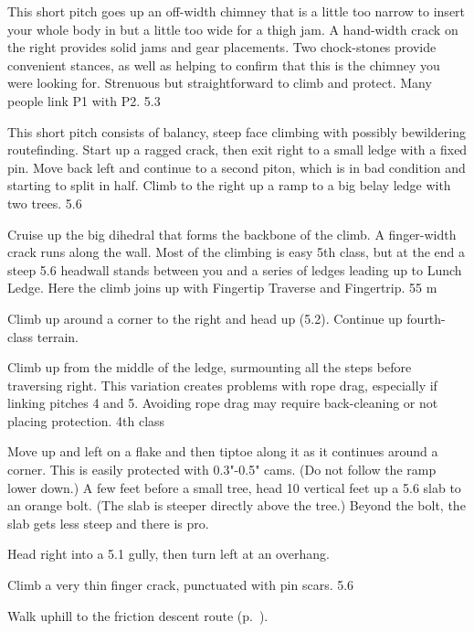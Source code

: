 \documentclass{tahquitz}
\begin{document}
 This short pitch goes up an off-width chimney that is a little too
narrow to insert your whole body in but a little too wide for a thigh jam.
A hand-width crack on the right provides solid jams and gear placements.
Two chock-stones provide convenient stances, as well as helping
to confirm that this is the chimney you were looking for. 
Strenuous but straightforward to climb and protect.
Many people link P1 with P2. 5.3

 This short pitch consists of balancy, steep face climbing with
possibly bewildering routefinding. Start up a ragged crack, then
exit right to a small ledge with a fixed pin.
Move back left and continue to a second piton, which is in bad condition
and starting to split in half. Climb to the right up a ramp to a big belay
ledge with two trees. 5.6

 Cruise up the big dihedral that forms the backbone of the climb. A
finger-width crack runs along the wall.
Most of the climbing is easy 5th class, but at the end a steep 5.6 headwall
stands between you and a series of ledges leading up to
Lunch Ledge. Here the climb joins up with Fingertip Traverse
and Fingertrip. 55 m


 Climb up around a corner to the right and head up (5.2).
Continue up fourth-class terrain.

 Climb up from the middle of the ledge, surmounting all the steps
before traversing right. This variation creates problems with rope drag, especially
if linking pitches 4 and 5. Avoiding rope drag may require back-cleaning or not
placing protection. 4th class

 Move up and left on a flake and then tiptoe along it as it
continues around a corner.  This is easily protected with 0.3"-0.5"
cams. (Do not follow the ramp lower down.)  A few feet before a small
tree, head 10 vertical feet up a 5.6 slab to an orange bolt. (The slab
is steeper directly above the tree.) Beyond the bolt, the slab gets
less steep and there is pro. 

 Head right into a 5.1 gully, then turn left at an overhang.

 Climb a very thin finger crack, punctuated with pin scars. 5.6

Walk uphill to the friction descent route  (p.~\pageref{subsec:friction-descent}).
\end{document}
